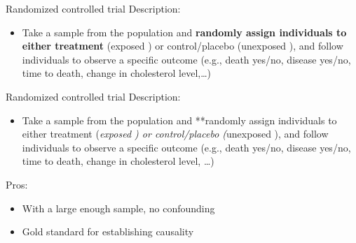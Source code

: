 \documentclass[
  ignorenonframetext,
]{beamer}
\providecommand{\tightlist}{%
  \setlength{\itemsep}{0pt}\setlength{\parskip}{0pt}}
\begin{document}
\begin{frame}{Randomized controlled trial}
\protect\hypertarget{randomized-controlled-trial}{}
Description:

\begin{itemize}
\tightlist
\item
  Take a sample from the population and \textbf{randomly assign
  individuals to either treatment} (exposed ) or control/placebo
  (unexposed ), and follow individuals to observe a specific outcome
  (e.g., death yes/no, disease yes/no, time to death, change in
  cholesterol level,\ldots)
\end{itemize}
\end{frame}

\begin{frame}{Randomized controlled trial}
\protect\hypertarget{randomized-controlled-trial-1}{}
Description:

\begin{itemize}
\tightlist
\item
  Take a sample from the population and **randomly assign individuals to
  either treatment (\emph{exposed ) or control/placebo (}unexposed ),
  and follow individuals to observe a specific outcome (e.g., death
  yes/no, disease yes/no, time to death, change in cholesterol level,
  \ldots)
\end{itemize}

Pros:

\begin{itemize}
\tightlist
\item
  With a large enough sample, no confounding
\item
  Gold standard for establishing causality
\end{itemize}
\end{frame}
\end{document}
